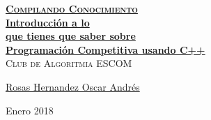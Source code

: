 \documentclass[12pt, fleqn]{report}                             %
\author{Oscar Andrés Rosas}                                     %
\theoremstyle{break}                                            %
\begin{document}
\begin{titlepage}
    
    \pagecolor{TitlePageColor}                                      %
    \color{white}                                                   %
    \newcommand{\Github}{https://compilandoconocimiento.github.io/Reference/} %

    \vspace                                                         %
    \baselineskip                                                   %

    \makebox[0pt][l]{\rule{1.3\textwidth}{3pt}}                     %
    
    \href{\Github}                                                  %
    {\textbf{\textsc{\Huge Compilando Conocimiento}}}\\[2.7cm]      %

    \href{\Github/LibroAnalisisVectorial}                           %
    {\fontsize{35}{46}\selectfont                                   %
        \textbf{Introducción a lo\\[0.6cm] 
        que tienes que saber sobre \\[0.4cm]
        Programación Competitiva usando C++}}\\[0.5cm]  %
    \textcolor{ColorSubtext}{\textsc{\Huge Club de Algoritmia ESCOM}}%
    
    \vfill                                                          %
    
    \href{https://SoyOscarRH.github.io}                            %
    {\LARGE \textsf{Rosas Hernandez Oscar Andrés}}                 %


    \vspace                                                         %
    \baselineskip                                                   %
    
    {\large \textsf{Enero 2018}}                                    %

\end{titlepage}
\end{document}
